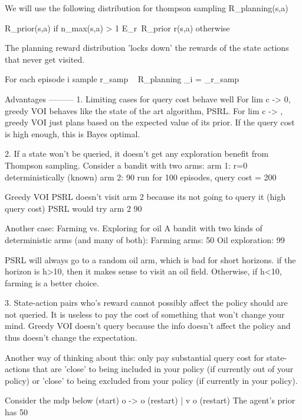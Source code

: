We will use the following distribution for thompson sampling
R_planning(s,a) ~ { R_prior(s,a)        if n_max(s,a) > 1
                    E_r~R_prior r(s,a)  otherwise

The planning reward distribution 'locks down' the rewards of the state actions that never get visited.

For each episode i 
  sample r_samp ~ R_planning  
  \pi_i = \pi_{r_samp}


Advantages
---------
1. Limiting cases for query cost behave well 
  For lim c -> 0, greedy VOI behaves like the state of the art algorithm, PSRL.
  For lim c -> \inf, greedy VOI just plans based on the expected value of its prior. If the query cost is high enough, this is Bayes optimal.

2. If a state won't be queried, it doesn't get any exploration benefit from Thompson sampling.
  Consider a bandit with two arms: 
    arm 1: r=0 deterministically (known) 
    arm 2: 90%
  run for 100 episodes, query cost = 200

  Greedy VOI PSRL doesn't visit arm 2 because its not going to query it (high query cost)
  PSRL would try arm 2 90%

  Another case: Farming vs. Exploring for oil
    A bandit with two kinds of deterministic arms (and many of both): 
      Farming arms: 50%
      Oil exploration: 99%

    PSRL will always go to a random oil arm, which is bad for short horizons. if the horizon is h>10, then it makes sense to visit an oil field. Otherwise, if h<10, farming is a better choice.
    

3. State-action pairs who's reward cannot possibly affect the policy should are not queried. It is useless to pay the cost of something that won't change your mind.
  Greedy VOI doesn't query because the info doesn't affect the policy and thus doesn't change the expectation.

  Another way of thinking about this:
    only pay substantial query cost for state-actions that are 'close' to being included in your policy (if currently out of your policy) or 'close' to being excluded from your policy (if currently in your policy).

    Consider the mdp below
  (start)
    o -> o (restart)
    |
    v
    o
    (restart)
    The agent's prior has 50%

}
